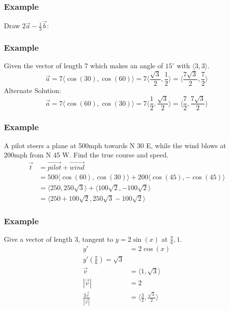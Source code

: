 \documentclass[letterpaper, 12pt]{math}
\begin{document}
\subsubsection*{Example}
Draw \( 2\vec{a}-\frac{1}{3}\vec{b} \):
\begin{center}
\end{center}

\subsubsection*{Example}
Given the vector of length 7 which makes an angle of \( 15^{\circ} \) with
\( \langle3,3\rangle \).
\[ \vec{a} = 7\langle\cos(30),\cos(60)\rangle =
  7\langle\frac{\sqrt{3}}{2},\frac{1}{2}\rangle =
  \langle\frac{7\sqrt{3}}{2},\frac{7}{2}\rangle \]
Alternate Solution:
\[ \vec{a} = 7\langle\cos(60),\cos(30)\rangle =
  7\langle\frac{1}{2},\frac{\sqrt{3}}{2}\rangle =
  \langle\frac{7}{2},\frac{7\sqrt{3}}{2}\rangle \]

\subsubsection*{Example}
A pilot steers a plane at 500mph towards N 30 E, while the wind blows at 200mph
from N 45 W. Find the true course and speed.
\begin{align*}
  \vec{t} &= \vec{pilot}+\vec{wind} \\
  &= 500\langle\cos(60),\cos(30)\rangle+200\langle\cos(45),-\cos(45)\rangle \\
  &= \langle250,250\sqrt{3}\rangle+\langle100\sqrt{2},-100\sqrt{2}\rangle \\
  &= \langle250+100\sqrt{2},250\sqrt{3}-100\sqrt{2}\rangle
\end{align*}

\subsubsection*{Example}
Give a vector of length 3, tangent to \( y = 2\sin(x) \) at
\( \frac{\pi}{6},1 \).
\begin{align*}
  y' &= 2\cos(x) \\
  y'(\frac{\pi}{6}) = \sqrt{3} \\
  \vec{v} &= \langle1,\sqrt{3}\rangle \\
  |\vec{v}| &= 2 \\
  \frac{3\vec{v}}{|\vec{v}|} &= \langle\frac{3}{2},\frac{\sqrt{3}}{2}\rangle
\end{align*}
\end{document}
